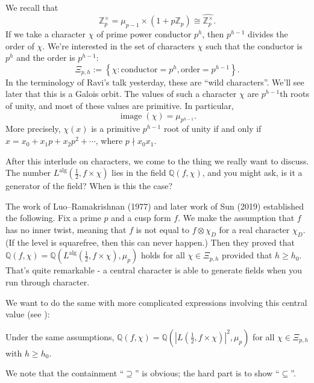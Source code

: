 \documentclass[reqno]{amsart} 
\begin{document}
We recall that
\begin{equation*}
  \mathbb{Z}_p^\times = \mu_{p - 1} \times(1 + p \mathbb{Z}_p)
  \cong \widehat{\mathbb{Z}^\times_p}.
\end{equation*}
If we take a character $\chi$ of prime power conductor $p^{h}$, then $p^{h - 1}$ divides the order of $\chi$.  We're interested in the set of characters $\chi$ such that the conductor is $p^{h}$ and the order is $p^{h - 1}$:
\begin{equation*}
  \Xi_{p, h} := \left\{ \chi : \mathrm{conductor} = p^{h}, \mathrm{order} = p^{h - 1} \right\}.
\end{equation*}
In the terminology of Ravi's talk yesterday, these are ``wild characters''.  We'll see later that this is a Galois orbit.  The values of such a character $\chi$ are $p^{h - 1}$th roots of unity, and most of these values are primitive.  In particular,
\begin{equation*}
  \operatorname{image}(\chi) = \mu_{p^{h - 1}}.
\end{equation*}
More precisely, $\chi(x)$ is a primitive $p^{h - 1}$ root of unity if and only if $x = x_0 + x_1 p + x_2 p^2 + \dotsb$, where $p \nmid x_0 x_1$.

After this interlude on characters, we come to the thing we really want to discuss.  The number $L^{\mathrm{alg}}(\tfrac{1}{2}, f \times \chi)$ lies in the field $\mathbb{Q}(f, \chi)$, and you might ask, is it a generator of the field?  When is this the case?

The work of Luo--Ramakrishnan (1977) and later work of Sun (2019) established the following.  Fix a prime $p$ and a cusp form $f$.  We make the assumption that $f$ has no inner twist, meaning that $f$ is not equal to $f \otimes \chi_D$ for a real character $\chi_D$.  (If the level is squarefree, then this can never happen.)  Then they proved that $\mathbb{Q}(f, \chi) = \mathbb{Q}(L^{\mathrm{alg}}(\tfrac{1}{2}, f \times \chi), \mu_p)$ holds for all $\chi \in \Xi_{p, h}$ provided that $h \geq h_0$.  That's quite remarkable - a central character is able to generate fields when you run through character.

We want to do the same with more complicated expressions involving this central value (see \cite{2025arXiv2503.15040}):
\begin{theorem}
  Under the same assumptions, $\mathbb{Q}(f, \chi) = \mathbb{Q}(\left\lvert L(\tfrac{1}{2}, f \times \chi) \right\rvert^2, \mu_p)$ for all $\chi \in \Xi_{p, h}$ with $h \geq h_0$.
\end{theorem}
We note that the containment ``$\supseteq$'' is obvious; the hard part is to show ``$\subseteq$''.
\end{document}
